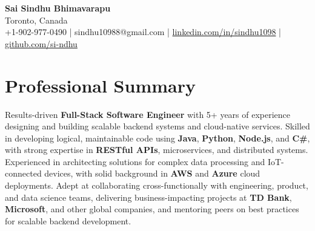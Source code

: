 \documentclass[letterpaper,11pt]{article}
\begin{document}
\begin{center}
  {\Large \textbf{Sai Sindhu Bhimavarapu}} \\
  Toronto, Canada \\
  +1-902-977-0490 \enspace | \enspace sindhu10988@gmail.com \enspace | \enspace \href{https://www.linkedin.com/in/sindhu1098/}{linkedin.com/in/sindhu1098} \enspace | \enspace \href{https://github.com/si-ndhu}{github.com/si-ndhu}
\end{center}

\section{Professional Summary}
  \begin{itemize}[leftmargin=0.15in, label={}]
    \small{\item{
     Results-driven \textbf{Full-Stack Software Engineer} with 5+ years of experience designing and building scalable backend systems and cloud-native services. Skilled in developing logical, maintainable code using \textbf{Java}, \textbf{Python}, \textbf{Node.js}, and \textbf{C\#}, with strong expertise in \textbf{RESTful APIs}, microservices, and distributed systems. Experienced in architecting solutions for complex data processing and IoT-connected devices, with solid background in \textbf{AWS} and \textbf{Azure} cloud deployments. Adept at collaborating cross-functionally with engineering, product, and data science teams, delivering business-impacting projects at \textbf{TD Bank}, \textbf{Microsoft}, and other global companies, and mentoring peers on best practices for scalable backend development.
    }}
  \end{itemize}
\vspace{-16pt}

\end{document}
